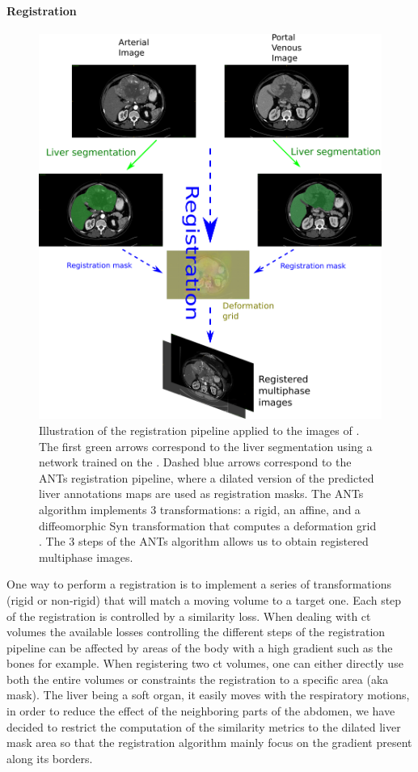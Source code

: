 \paragraph{Registration}\label{registration}

\begin{figure}[th!]
\centering
\includegraphics[width=0.7\linewidth]{../HistologicalGradePrediction/images/RegistrationTCIA_pipeline_vertical2}
\caption{Illustration of the registration pipeline applied to the images of \textbf{}. The first green arrows correspond to the liver segmentation using a network trained on the \textbf{}. Dashed blue arrows correspond to the ANTs registration pipeline, where a dilated version of the predicted liver annotations maps are used as registration masks. The ANTs algorithm implements 3 transformations: a rigid, an affine, and a diffeomorphic Syn transformation that computes a deformation grid \cite{Avants2008}. The 3 steps of the ANTs algorithm allows us to obtain registered multiphase images.}
\label{fig:RegistrationTCIA_pipeline_vertical2}
\end{figure}


One way to perform a registration is to implement a series of
transformations (rigid or non-rigid) that will match a moving volume to
a target one. Each step of the registration is controlled by a
similarity loss.
When dealing with \ac{ct} volumes the available losses controlling the
different steps of the registration pipeline can be affected by areas of
the body with a high gradient such as the bones for example. When
registering two \ac{ct} volumes, one can either directly use both the entire
volumes or constraints the registration to a specific area (aka mask).
The liver being a soft organ, it easily moves with the respiratory
motions, in order to reduce the effect of the neighboring parts of the
abdomen, we have decided to restrict the computation of the similarity
metrics to the dilated liver mask area so that the registration
algorithm mainly focus on the gradient present along its borders.

